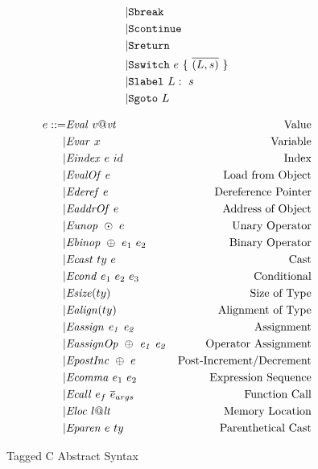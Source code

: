 \documentclass[acmsmall,review,anonymous]{acmart}\settopmatter{printfolios=true,printccs=false,printacmref=false}
\begin{document}
\begin{figure}
\begin{subfigure}[t]{0.3\textwidth}
\[\begin{aligned}
    | & \mathtt{Sbreak} \\
    | & \mathtt{Scontinue} \\
    | & \mathtt{Sreturn} \\
    | & \mathtt{Sswitch} ~ e ~ \{ ~ \overline{(L,s)} ~ \} \\
    | & \mathtt{Slabel} ~ L: ~ s \\
    | & \mathtt{Sgoto} ~ L \\    
    \end{aligned}\]
  \end{subfigure}
  \begin{subfigure}[t]{0.69\textwidth}
    \[\begin{aligned}
    e ::= & \mathit{Eval} ~ v@\mathit{vt} & \textnormal{Value} \\
    | & \mathit{Evar} ~ x & \textnormal{Variable} \\
    | & \mathit{Eindex} ~ e ~ id & \textnormal{Index} \\
    | & \mathit{EvalOf} ~ e & \textnormal{Load from Object} \\
    | & \mathit{Ederef} ~ e & \textnormal{Dereference Pointer} \\
    | & \mathit{EaddrOf} ~ e & \textnormal{Address of Object} \\
    | & \mathit{Eunop} ~ \odot ~ e & \textnormal{Unary Operator} \\
    | & \mathit{Ebinop} ~ \oplus ~ e_1 ~ e_2 & \textnormal{Binary Operator} \\
    | & \mathit{Ecast} ~ ty ~ e & \textnormal{Cast} \\
    | & \mathit{Econd} ~ e_1 ~ e_2 ~ e_3 & \textnormal{Conditional} \\
    | & \mathit{Esize}(ty) & \textnormal{Size of Type} \\
    | & \mathit{Ealign}(ty) & \textnormal{Alignment of Type} \\
    | & \mathit{Eassign ~ e_1 ~ e_2} & \textnormal{Assignment} \\
    | & \mathit{EassignOp ~ \oplus ~ e_1 ~ e_2} & \textnormal{Operator Assignment} \\
    | & \mathit{EpostInc} ~ \oplus ~ e & \textnormal{Post-Increment/Decrement} \\
    | & \mathit{Ecomma} ~ e_1 ~ e_2 & \textnormal{Expression Sequence} \\
    | & \mathit{Ecall} ~ e_f ~ \overline{e}_{args} & \textnormal{Function Call} \\
    | & \mathit{Eloc} ~ l@\mathit{lt} & \textnormal{Memory Location} \\
    | & \mathit{Eparen} ~ e ~ ty & \textnormal{Parenthetical Cast} \\
    \end{aligned}\]
  \end{subfigure}
  \caption{Tagged C Abstract Syntax}
  \label{fig:syntax}
\end{figure}
\end{document}
